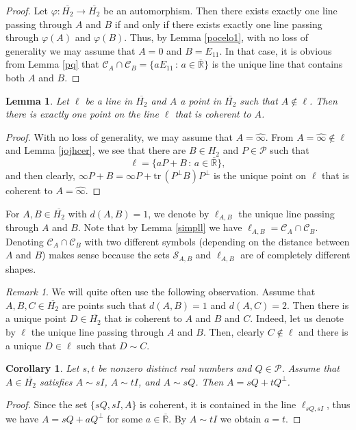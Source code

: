 \documentclass[10pt,a4paper]{amsart}
\providecommand{\index}[1]{}
\newcommand\cC{{\mathcal{C}}}
\newcommand\oH{{\overline{H_2}}}
\newcommand\oi{{\widehat{\infty}}}
\newcommand\oR{{\overline{\mathbb{R}}}}
\newtheorem{lemma}[theorem]{Lemma}
\newtheorem{corollary}[theorem]{Corollary}
\theoremstyle{definition}
\theoremstyle{remark}
\newtheorem{remark}[theorem]{Remark}
\numberwithin{subsection}{section}
\numberwithin{equation}{section}
\begin{document}
\begin{proof}
Let $\varphi \colon \oH \to \oH$ be an automorphism. Then there exists exactly one line passing through $A$ and $B$ if and only if there exists exactly one line passing through $\varphi(A)$ and $\varphi(B)$. Thus, by Lemma \ref{pocelo1},
with no loss of generality we may assume that $A=0$ and $B=E_{11}$. 
In that case, it is obvious from Lemma \ref{pq} that $\cC_A\cap\cC_B = \{ a E_{11} \, : \, a\in {\oR} \}$ is the unique line that contains both $A$ and $B$.
\end{proof}

\begin{lemma}\label{simplll}
Let $\ell$ be a line in $\oH$ and $A$ a point in $\oH$ such that $A\not\in \ell$. Then there is exactly one point on the line $\ell$ that is coherent to $A$.
\end{lemma}

\begin{proof}
With no loss of generality, we may assume that $A = \oi$. 
From $A = \oi \not\in \ell$ and Lemma \ref{jojhcer}, we see that there are
$B\in H_2$ and $P \in \mathcal{P}$ such that
\[
\ell = \{ aP+B  \, : \, a \in \oR \},
\]
and then clearly, $\infty P+B = \infty P + \mathrm{tr}\, (P^\perp B) P^\perp$ is the unique point on $\ell$ that is coherent to $A = \oi$.
\end{proof}



For $A,B \in \oH$ with $d(A,B) = 1$, we denote by $\ell_{A,B}$ \index{$l_A,B$@$\ell_{A,B}$} the unique line passing through $A$ and $B$. Note that by Lemma \ref{simpll} we have $\ell_{A,B} = \mathcal{C}_A \cap \mathcal{C}_B$. 
Denoting $\mathcal{C}_A \cap \mathcal{C}_B$ with two different symbols (depending on the distance between $A$ and $B$) makes sense because the sets $\mathcal{S}_{A,B}$ and $\ell_{A,B}$ are of completely different shapes. 

\begin{remark}\label{ceruk}
We will quite often use the following observation. Assume that $A,B,C \in \oH$ are points such that $d(A,B) =1$ and $d(A,C) =2$. Then there is a unique point $D \in \oH$ that is coherent to $A$ and $B$ and $C$. Indeed, let us denote by $\ell$ the unique line passing through $A$ and $B$. Then, clearly $C \not\in \ell$ and there is a unique $D \in \ell$ such that $D \sim C$.
\end{remark}


\begin{corollary}\label{veryeasy2}
Let $s,t$ be nonzero distinct real numbers and $Q \in \mathcal{P}$. Assume that $A\in \oH$ satisfies $A \sim sI$, $A\sim tI$, and $A\sim sQ$. Then $A = sQ + tQ^\perp$.
\end{corollary} 
\begin{proof}
Since the set $\{sQ, sI, A\}$ is coherent, it is contained in the line $\ell_{sQ,sI}$, thus we have $A = sQ + aQ^\perp$ for some $a\in {\oR}$. 
By $A\sim tI$ we obtain $a=t$.
\end{proof}
\end{document}
